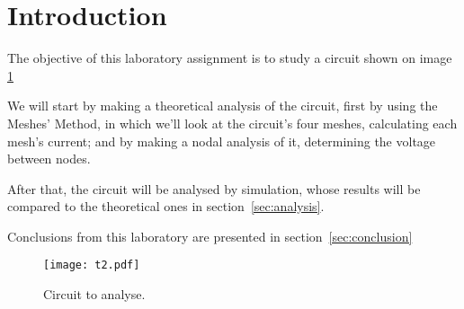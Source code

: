 \section{Introduction}

The objective of this laboratory assignment is to study a circuit shown on image \ref{Fig1: circuit}

We will start by making a theoretical analysis of the circuit, first by  using the Meshes' Method, in which we’ll look at the circuit’s four meshes, calculating each mesh’s current; and by making a nodal analysis of it, determining the voltage between nodes.

After that, the circuit will be analysed by simulation, whose results will be compared to the theoretical ones in section~\ref{sec:analysis}.

Conclusions from this laboratory are presented in section~\ref{sec:conclusion}

\begin{figure}[h] \centering
\texttt{[image: t2.pdf]}
\caption{Circuit to analyse.}
\label{Fig1: circuit}
\end{figure}
